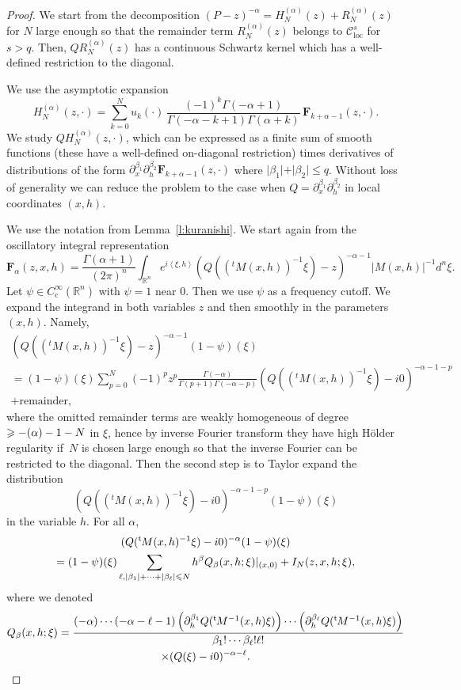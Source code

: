 \documentclass[10pt]{amsart}
\let\pazocal\mathscr
\theoremstyle{definition}
\renewcommand\c{\mathrm{c}}
\newcommand\loc{\mathrm{loc}}
\let\cv\alpha
\let\varm k
\let\Re\relax
\DeclareMathOperator{\Re}{Re}
\renewcommand{\t}{{{}^{\mathrm{t}\mkern-2mu}}}
\begin{document}
\begin{proof}
We start from the decomposition
$(P-z)^{-\cv}=H_N^{(\cv)}(z)+R_N^{(\cv)}(z)$ for $N$ large enough so that the remainder term $R_N^{(\cv)}(z)$ belongs to $\pazocal{C}^{s}_{\loc}$ for $s>q$. Then, $QR_N^{(\cv)}(z)$ has a continuous Schwartz kernel which has a well-defined restriction to the diagonal.

We use the asymptotic expansion
\[
H_N^{(\cv)}(z,\cdot) =
\sum_{\varm=0}^N u_\varm(\cdot)\,\frac{(-1)^\varm\Gamma(-\cv+1)}{\Gamma(-\cv-\varm+1)\Gamma(\cv+\varm)}\, \mathbf{F}_{\varm+\cv-1}(z,\cdot).
\]
We study $QH_N^{(\cv)}(z,\cdot)$, which can be expressed as a finite sum of smooth functions (these have a well-defined on-diagonal restriction)
times derivatives of distributions of the form
$\partial_x^{\beta_1}\partial_h^{\beta_2} \mathbf{F}_{\varm+\cv-1}(z,\cdot)$ where $\vert\beta_1\vert+\vert\beta_2\vert\leqslant q$.
Without loss of generality we can reduce the problem to the case when
$Q=\partial_x^{\beta_1}\partial_h^{\beta_2}$ in local coordinates $(x,h)$.

We use the notation from Lemma~\ref{l:kuranishi}.
We start again from the oscillatory integral representation\vspace*{-3pt}
\[
\mathbf{F}_\cv(z,x,h)=\frac{\Gamma(\cv+1)}{(2\pi)^n}\int_{\mathbb{R}^n} e^{i\left\langle \xi,h\right\rangle} \left(Q((^tM(x,h))^{-1}\xi)-z \right)^{-\cv-1}\vert M(x,h) \vert^{-1}d^n\xi.
\]
Let $\psi\in C^\infty_\c(\mathbb{R}^n)$ with $\psi=1$ near $0$. Then we use $\psi$ as a frequency cutoff.
We expand the integrand in both variables $z$ and then smoothly in the parameters $(x,h)$. Namely,
\begin{multline*}
\left(Q((^tM(x,h))^{-1}\xi)-z \right)^{-\cv-1}(1-\psi)(\xi)\\
=(1-\psi)(\xi)\sum_{p=0}^N (-1)^pz^p \frac{\Gamma(-\cv)}{\Gamma(p+1)\Gamma(-\cv-p)} \left(Q((^tM(x,h))^{-1}\xi)-i0 \right)^{-\cv-1-p}\\
+ \text{remainder},
\end{multline*}
where the omitted remainder terms are weakly homogeneous of
degree $\geqslant -\Re(\cv)\allowbreak-1-\nobreak N$ in $\xi$, hence by inverse Fourier transform
they have high Hölder regularity if~$N$ is chosen large enough so that the inverse Fourier can be restricted to the diagonal.
Then the second step is to Taylor expand the distribution
\[
\left(Q((^tM(x,h))^{-1}\xi)-i0 \right)^{-\cv-1-p}(1-\psi)(\xi)
\]
in the variable $h$.
For all $\cv$,
\begin{multline*}
(Q(\t M(x, h)^{-1}\xi)-i0)^{-\cv}(1-\psi)(\xi) \\
=(1-\psi)(\xi)\sum_{\ell, \vert \beta_1\vert+\dots+\vert\beta_\ell\vert\leqslant N} h^\beta Q_\beta(x,h;\xi)
|_{(x,0)}+I_N(z,x,h;\xi),
\end{multline*}
where we denoted
\begin{multline*}
Q_\beta(x,h;\xi) = \frac{(-\cv)\cdots(-\cv-\ell-1) \left(\partial_h^{\beta_1}Q(\t M^{-1}(x,h)\xi)\right)\cdots
\left(\partial_h^{\beta_\ell}Q(\t M^{-1}(x,h)\xi)\right) }{\beta_1!\cdots\beta_\ell!\ell!}
\\ \times (Q(\xi)-i0)^{-\cv-\ell}.
\end{multline*}


\end{proof}
\end{document}
